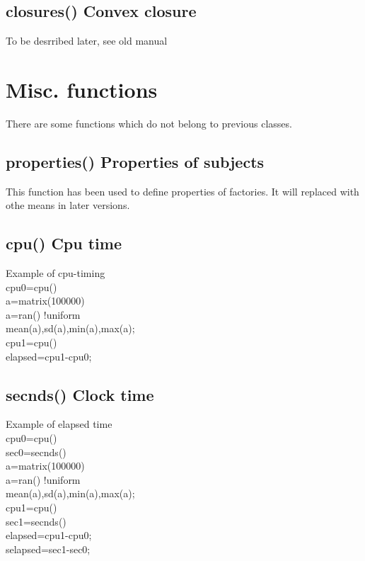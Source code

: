 \subsection{\textcolor{VioletRed}{closures}() Convex closure}
\label{closures}
To be desrribed later,  see old manual
\section{Misc. functions}
\label{misc}
There are some functions which do not belong to previous classes.
\subsection{\textcolor{VioletRed}{properties}() Properties of subjects}
\label{properties}
This function has been used to define properties of factories.
It will replaced with othe means in later versions.
\subsection{\textcolor{VioletRed}{cpu}() Cpu time}
\label{cpu}
\begin{example}[cpuex]Example of cpu-timing\\
\label{cpuex}
cpu0=\textcolor{VioletRed}{cpu}()\\
a=\textcolor{VioletRed}{matrix}(100000)\\
a=\textcolor{VioletRed}{ran}() !uniform\\
\textcolor{VioletRed}{mean}(a),\textcolor{VioletRed}{sd}(a),\textcolor{VioletRed}{min}(a),\textcolor{VioletRed}{max}(a);\\
cpu1=\textcolor{VioletRed}{cpu}()\\
elapsed=cpu1-cpu0;
\end{example}
\subsection{\textcolor{VioletRed}{secnds}() Clock time}
\label{secnds}
\begin{example}[secondsex]Example of elapsed time\\
\label{secondsex}
cpu0=\textcolor{VioletRed}{cpu}()\\
sec0=\textcolor{VioletRed}{secnds}()\\
a=\textcolor{VioletRed}{matrix}(100000)\\
a=\textcolor{VioletRed}{ran}() !uniform\\
\textcolor{VioletRed}{mean}(a),\textcolor{VioletRed}{sd}(a),\textcolor{VioletRed}{min}(a),\textcolor{VioletRed}{max}(a);\\
cpu1=\textcolor{VioletRed}{cpu}()\\
sec1=\textcolor{VioletRed}{secnds}()\\
elapsed=cpu1-cpu0;\\
selapsed=sec1-sec0;
\end{example}
